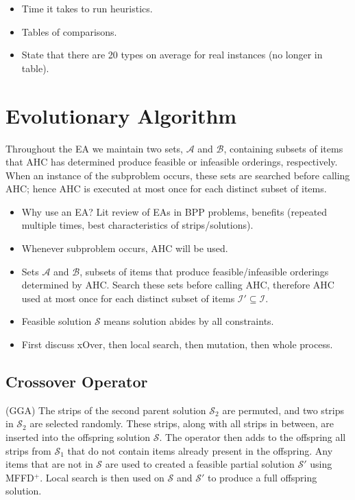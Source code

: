 \documentclass{elsarticle}
\begin{document}
{\color{Rhodamine}
\begin{itemize}
	\item Time it takes to run heuristics.
	\item Tables of comparisons.
	\item State that there are 20 types on average for real instances (no longer in table).
\end{itemize}
}


\section{Evolutionary Algorithm}
\label{sec:ea}
Throughout the EA we maintain two sets, $\mathcal{A}$ and $\mathcal{B}$, containing subsets of items that AHC has determined produce feasible or infeasible orderings, respectively. When an instance of the subproblem occurs, these sets are searched before calling AHC; hence AHC is executed at most once for each distinct subset of items.

{\color{OrangeRed}
\begin{itemize}
	\item Why use an EA? Lit review of EAs in BPP problems, benefits (repeated multiple times, best characteristics of strips/solutions).
	\item Whenever subproblem occurs, AHC will be used.
	\item Sets $\mathcal{A}$ and $\mathcal{B}$, subsets of items that produce feasible/infeasible orderings determined by AHC. Search these sets before calling AHC, therefore AHC used at most once for each distinct subset of items $\mathcal{I}' \subseteq \mathcal{I}$.
	\item Feasible solution $\mathcal{S}$ means solution abides by all constraints.
	\item First discuss xOver, then local search, then mutation, then whole process.
\end{itemize}
}


\subsection{Crossover Operator}
\label{sub:xover}
(GGA) The strips of the second parent solution $\mathcal{S}_2$ are permuted, and two strips in $\mathcal{S}_2$ are selected randomly. These strips, along with all strips in between, are inserted into the offspring solution $\mathcal{S}$. The operator then adds to the offspring all strips from $\mathcal{S}_1$ that do not contain items already present in the offspring. Any items that are not in $\mathcal{S}$ are used to created a feasible partial solution $\mathcal{S}'$ using MFFD$^+$. Local search is then used on $\mathcal{S}$ and $\mathcal{S}'$ to produce a full offspring solution.
\end{document}
